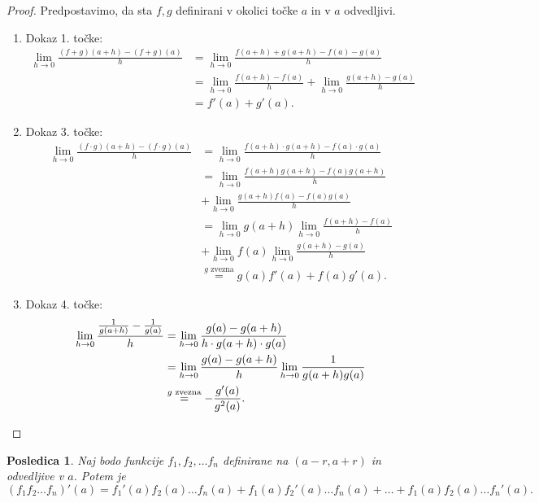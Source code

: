 \documentclass[10pt, a4paper]{article}
\newtheorem{posledica}[izr]{Posledica}
\newenvironment{noticeC}{%
  \tcolorbox[%
  notitle,
  empty,
  enhanced,  %
  breakable,
  coltext=black, 
  fontupper=\rmfamily,
  noparskip,
  sharp corners,
  boxrule=-1pt,  %
  frame hidden,
  left=7pt,  %
  right=7pt,
  top=5pt,
  bottom=5pt,
  before skip=2.5ex plus 2pt,
  after skip=2.5ex plus 2pt,
  overlay unbroken and last={%
  },
  ]}
{\endtcolorbox}
\newenvironment{dokaz}%
  {\begin{noticeC}\begin{proof}}%
  {\end{proof}\end{noticeC}}
\newcommand{\limf}[3]{\lim_{#1 \to #2} {#3}}
\begin{document}
\begin{dokaz}
    Predpostavimo, da sta $f,g$ definirani v okolici točke $a$ in v $a$ odvedljivi.
    \begin{enumerate}
        \item Dokaz 1. točke:
        \begin{align*}
            \limf{h}{0}{\frac{(f+g)(a+h) - (f+g)(a)}{h}} &= \limf{h}{0}{\frac{f(a+h) + g(a+h) - f(a) - g(a)}{h}}\\
            &= \limf{h}{0}{\frac{f(a+h) - f(a)}{h}} + \limf{h}{0}{\frac{g(a+h) - g(a)}{h}}\\
            &= f'(a) + g'(a).
        \end{align*}
        \item Dokaz 3. točke:
        \begin{align*}
            \limf{h}{0}{\frac{(f\cdot  g)(a+h) - (f \cdot g)(a)}{h}} &= \limf{h}{0}{\frac{f(a+h) \cdot g(a+h) - f(a) \cdot g(a)}{h}}\\
            &= \limf{h}{0}{\frac{f(a+h) g(a+h) - f(a) g(a+h)}{h}}\\ &+ \limf{h}{0}{\frac{g(a+h) f(a) - f(a) g(a)}{h}}\\
            &= \limf{h}{0}{g(a+h)} \limf{h}{0}{\frac{f(a+h) - f(a)}{h}}\\ &+ \limf{h}{0}{f(a)}\limf{h}{0}{\frac{g(a+h) - g(a)}{h}}\\
            &\stackrel{\text{$g$ zvezna}}{=} g(a) f'(a) + f(a) g'(a).
        \end{align*}
        \item Dokaz 4. točke:
        \begin{align*}
            \limf{h}{0}{\frac{\frac{1}{g(a+h)} - \frac{1}{g(a)}}{h}} &= \limf{h}{0}{\frac{g(a) - g(a+h)}{h \cdot g(a+h) \cdot g(a)}}\\
            &= \limf{h}{0}{\frac{g(a) - g(a+h)}{h}} \limf{h}{0}{\frac{1}{g(a+h)g(a)}}\\
            &\stackrel{\text{$g$ zvezna}}{=} -\frac{g'(a)}{g^2(a)}. \qedhere
        \end{align*}
    \end{enumerate}
\end{dokaz}

\begin{posledica}
    Naj bodo funkcije $f_1, f_2, \dots f_n$ definirane na $(a-r, a+r)$ in odvedljive v $a$. Potem je
    $$(f_1 f_2 \dots f_n)'(a) = f_1'(a) f_2(a) \dots f_n(a) + f_1 (a) f_2'(a) \dots f_n(a) + \dots + f_1(a) f_2(a) \dots f_n'(a).$$
\end{posledica}
\end{document}
